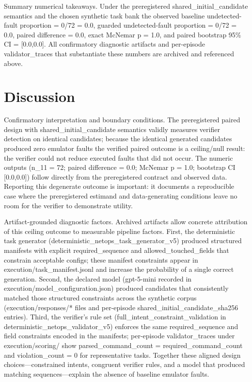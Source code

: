 \documentclass[conference]{IEEEtran}
\begin{document}
Summary numerical takeaways. Under the preregistered shared\_initial\_candidate semantics and the chosen synthetic task bank the observed baseline undetected-fault proportion = 0/72 = 0.0, guarded undetected-fault proportion = 0/72 = 0.0, paired difference = 0.0, exact McNemar p = 1.0, and paired bootstrap 95\% CI = [0.0,0.0]. All confirmatory diagnostic artifacts and per-episode validator\_traces that substantiate these numbers are archived and referenced above.

\section{Discussion}
Confirmatory interpretation and boundary conditions. The preregistered paired design with shared\_initial\_candidate semantics validly measures verifier detection on identical candidates; because the identical generated candidates produced zero emulator faults the verified paired outcome is a ceiling/null result: the verifier could not reduce executed faults that did not occur. The numeric outputs (n\_11 = 72; paired difference = 0.0; McNemar p = 1.0; bootstrap CI [0.0,0.0]) follow directly from the preregistered contract and observed data. Reporting this degenerate outcome is important: it documents a reproducible case where the preregistered estimand and data-generating conditions leave no room for the verifier to demonstrate utility.

Artifact-grounded diagnostic factors. Archived artifacts allow concrete attribution of this ceiling outcome to measurable pipeline factors. First, the deterministic task generator (deterministic\_netops\_task\_generator\_v5) produced structured manifests with explicit required\_sequence and allowed\_touched\_fields that constrain acceptable configs; these manifest constraints appear in execution/task\_manifest.jsonl and increase the probability of a single correct generation. Second, the declared model (gpt-5-mini recorded in execution/model\_configuration.json) produced candidates that consistently matched those structured constraints across the synthetic corpus (execution/responses/* files and per-episode shared\_initial\_candidate\_sha256 entries). Third, the verifier's rule set (full\_intent\_constraint\_validation in deterministic\_netops\_validator\_v5) enforces the same required\_sequence and field constraints encoded in the manifests; per-episode validator\_traces under execution/scoring/ show parsed\_command\_count = required\_command\_count and violation\_count = 0 for representative tasks. Together these aligned design choices---constrained intents, congruent verifier rules, and a model that produced matching sequences---explain the absence of baseline emulator faults.
\end{document}
